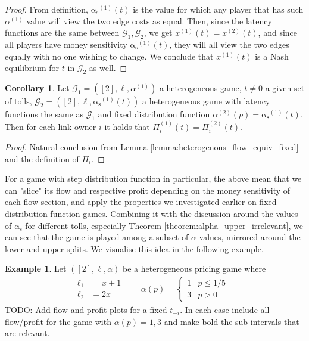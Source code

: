 \documentclass[10pt,a4paper]{book}
\newcommand{\as}{\mathrm{\alpha_s}}
\newcommand{\Gm}{\mathcal{G}}
\theoremstyle{definition}
\newtheorem{corollary}[definition]{Corollary}
\theoremstyle{comment}
\newtheorem{example}[definition]{Example}
\begin{document}
\begin{proof}
	From definition, $\as^{(1)}(t)$ is the value for which any player that has such $\alpha^{(1)}$ value will view the two edge costs as equal.
	Then, since the latency functions are the same between $\Gm_1, \Gm_2$, we get $x^{(1)}(t) = x^{(2)}(t)$, and since all players have money sensitivity $\as^{(1)}(t)$, they will all view the two edges equally with no one wishing to change.
	We conclude that $x^{(1)}(t)$ is a Nash equilibrium for $t$ in $\Gm_2$ as well.
\end{proof}

\begin{corollary}
	\label{corollary:heterogenous_profit_equiv_fixed}
	Let $\Gm_1 = ([2], \ell, \alpha^{(1)})$ a heterogeneous game, $t \ne 0$ a given set of tolls, $\Gm_2 = ([2], \ell, \as^{(1)}(t))$ a heterogeneous game with latency functions the same as $\Gm_1$ and fixed distribution function $\alpha^{(2)}(p) = \as^{(1)}(t)$.
	Then for each link owner $i$ it holds that $\Pi_i^{(1)}(t) = \Pi_i^{(2)}(t)$.
\end{corollary}

\begin{proof}
	Natural conclusion from Lemma \ref{lemma:heterogenous_flow_equiv_fixed} and the definition of $\Pi_i$.
\end{proof}

For a game with step distribution function in particular, the above mean that we can "slice" its flow and respective profit depending on the money sensitivity of each flow section, and apply the properties we investigated earlier on fixed distribution function games.
Combining it with the discussion around the values of $\as$ for different tolls, especially Theorem \ref{theorem:alpha_upper_irrelevant}, we can see that the game is played among a subset of $\alpha$ values, mirrored around the lower and upper splits.
We visualise this idea in the following example.

\begin{example}
	\label{example:a_step_simple}
	Let $([2], \ell, \alpha)$ be a heterogeneous pricing game where
	\begin{align*}
		\begin{aligned}
			\ell_1 &= x + 1 \\
			\ell_2 &= 2x
		\end{aligned}
		\qquad
		\alpha(p) =
		\begin{cases}
			1 & p \le 1 / 5 \\
			3 & p > 0
		\end{cases}&
	\end{align*}
	TODO: Add flow and profit plots for a fixed $t_{-i}$.
	In each case include all flow/profit for the game with $\alpha(p) = 1, 3$ and make bold the sub-intervals that are relevant.
\end{example}
\end{document}
